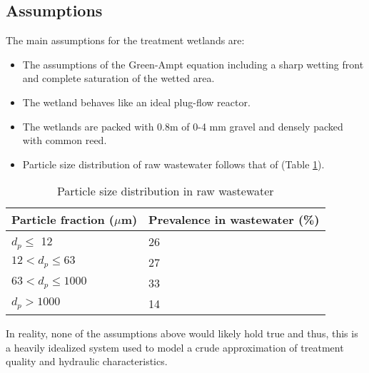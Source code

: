 \subsection{Assumptions}
The main assumptions for the treatment wetlands are:
\begin{itemize}
    \item The assumptions of the Green-Ampt equation including a sharp wetting front and complete saturation of the wetted area.
    \item The wetland behaves like an ideal plug-flow reactor.
    \item The wetlands are packed with 0.8m of 0-4 mm gravel and densely packed with common reed.
    \item Particle size distribution of raw wastewater follows that of \cite{particle_size_dist} (Table \ref{tab:particle_size_dist}).
\end{itemize}
\begin{table}[ht]
    \centering
    \begin{tabular}{l|l}
    Particle fraction ($\mu$m) & Prevalence in wastewater (\%)  \\
    \hline
    $d_p \leq$ 12 & 26 \\
    $12 < d_p \leq 63$ & 27 \\
    $63 < d_p \leq 1000$ & 33 \\
    $d_p > 1000$ & 14
    \end{tabular}
    \caption{Particle size distribution in raw wastewater}
    \label{tab:particle_size_dist}
\end{table}
In reality, none of the assumptions above would likely hold true and thus, this is a heavily idealized system used to model a crude approximation of treatment quality and hydraulic characteristics.
